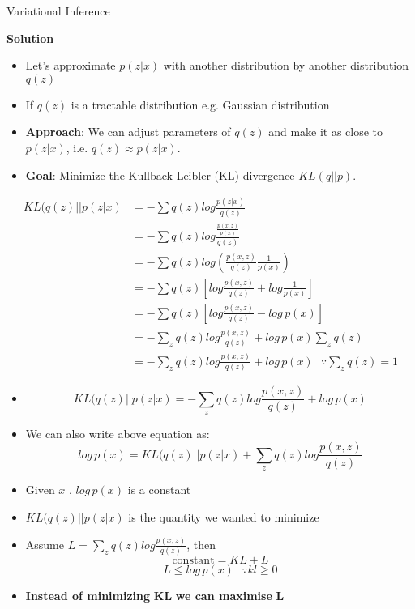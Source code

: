 \begin{frame}[allowframebreaks]{Variational Inference}

    \textbf{\large Solution}
    \begin{itemize}
        \item Let's approximate $p(z|x)$ with another distribution by another distribution $q(z)$
        \item If $q(z)$ is a tractable distribution e.g. Gaussian distribution
        \item \textbf{Approach}: We can adjust parameters of $q(z)$ and make it as close to $p(z|x)$, i.e. $q(z) \approx p(z|x)$.
        \item \textbf{Goal}: Minimize the Kullback-Leibler (KL) divergence $KL(q||p)$.
    \end{itemize}

\framebreak
\begin{equation*}
    \begin{split}
        KL(q(z)||p(z|x) & = - \sum q(z) log \frac{ p(z|x)}{q(z)}\\
        & = - \sum q(z) log \frac{\frac{p(x,z)}{p(x)}}{q(z)}\\
        & = - \sum q(z) log \left ( \frac{p(x,z)}{q(z)}\frac{1}{p(x)} \right )\\
        & = - \sum q(z) \left [log \frac{p(x,z)}{q(z)} + log\frac{1}{p(x)} \right ]\\
        & = - \sum q(z) \left [log \frac{p(x,z)}{q(z)} - log \, p(x) \right ]\\
        & = - \sum_z q(z) log \frac{p(x,z)}{q(z)} + log \, p(x) \sum_z q(z)\\
        & = - \sum_z q(z) log \frac{p(x,z)}{q(z)} + log \, p(x) \,\,\,\, \because \sum_z q(z) = 1
    \end{split}
\end{equation*}

\framebreak

\begin{itemize}
    \item $$KL(q(z)||p(z|x) = - \sum_z q(z) log \frac{p(x,z)}{q(z)} + log \, p(x) $$
    \item We can also write above equation as:
    $$log \, p(x) = KL(q(z)||p(z|x) + \sum_z q(z) log \frac{p(x,z)}{q(z)}$$
\end{itemize}

\framebreak
    

\begin{itemize}
        \item Given $x$ , $log \, p(x)$ is a constant
        \item $KL(q(z)||p(z|x)$ is the quantity we wanted to minimize
        \item Assume $L = \sum_z q(z) log \frac{p(x,z)}{q(z)}$, then
        $$\text{constant} = KL + L$$
        $$L \leq log \, p(x) \,\,\,\, \because kl \geq 0$$

    \item \textbf{Instead of minimizing} $\mathbf{KL}$ \textbf{we can maximise} $\mathbf{L}$
\end{itemize}
\end{frame}